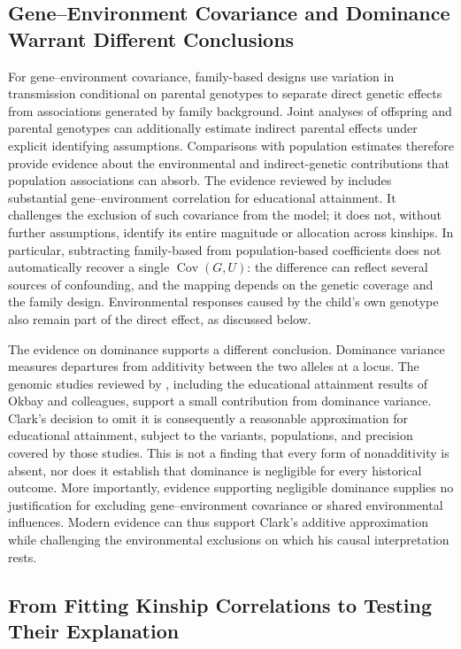 \documentclass[12pt]{article}
\begin{document}
\subsection{Gene--Environment Covariance and Dominance Warrant Different Conclusions}

For gene--environment covariance, family-based designs use variation in
transmission conditional on parental genotypes to separate direct genetic
effects from associations generated by family background. Joint analyses
of offspring and parental genotypes can additionally estimate indirect
parental effects under explicit identifying assumptions. Comparisons with
population estimates therefore provide evidence about the environmental
and indirect-genetic contributions that population associations can
absorb. The evidence reviewed by \citet[Sections~4.3--4.7]{BenjaminEtAl2026}
includes substantial gene--environment correlation for educational
attainment. It challenges the exclusion of such covariance from the model;
it does not, without further assumptions, identify its entire magnitude
or allocation across kinships. In particular, subtracting family-based
from population-based coefficients does not automatically recover a single
$\operatorname{Cov}(G,U)$: the difference can reflect several sources of
confounding, and the mapping depends on the genetic coverage and the
family design. Environmental responses caused by the child's own genotype
also remain part of the direct effect, as discussed below.

The evidence on dominance supports a different conclusion. Dominance
variance measures departures from additivity between the two alleles at
a locus. The genomic studies reviewed by
\citet[Sections~3.2 and~4.7]{BenjaminEtAl2026}, including the educational
attainment results of Okbay and colleagues, support a small contribution
from dominance variance. Clark's decision to omit it is consequently a
reasonable approximation for educational attainment, subject to the
variants, populations, and precision covered by those studies. This is
not a finding that every form of nonadditivity is absent, nor does it
establish that dominance is negligible for every historical outcome.
More importantly, evidence supporting negligible dominance supplies no
justification for excluding gene--environment covariance or shared
environmental influences. Modern evidence can thus support Clark's
additive approximation while challenging the environmental exclusions
on which his causal interpretation rests.

\subsection{From Fitting Kinship Correlations to Testing Their Explanation}
\end{document}
